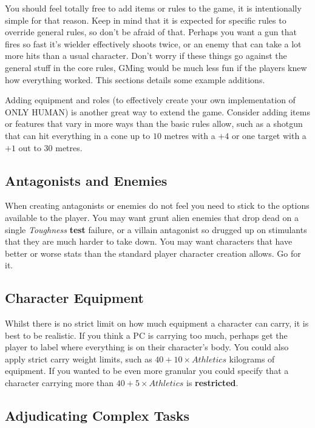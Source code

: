 \documentclass[11pt]{article}
\begin{document}
\begin{multicols}{3}
  You should feel totally free to add items or rules to the game, it is intentionally simple for that reason. Keep in mind that it is expected for specific rules to override general rules, so don't be afraid of that. Perhaps you want a gun that fires so fast it's wielder effectively shoots twice, or an enemy that can take a lot more hits than a usual character. Don't worry if these things go against the general stuff in the core rules, GMing would be much less fun if the players knew how everything worked. This sections details some example additions.

  Adding equipment and roles (to effectively create your own implementation of ONLY HUMAN) is another great way to extend the game. Consider adding items or features that vary in more ways than the basic rules allow, such as a shotgun that can hit everything in a cone up to $10$ metres with a $+4$ or one target with a $+1$ out to $30$ metres.

  \subsection*{Antagonists and Enemies}

  When creating antagonists or enemies do not feel you need to stick to the options available to the player. You may want grunt alien enemies that drop dead on a single \textit{Toughness} \textbf{test} failure, or a villain antagonist so drugged up on stimulants that they are much harder to take down. You may want characters that have better or worse stats than the standard player character creation allows. Go for it.

  \subsection*{Character Equipment}

  Whilst there is no strict limit on how much equipment a character can carry, it is best to be realistic. If you think a PC is carrying too much, perhaps get the player to label where everything is on their character's body. You could also apply strict carry weight limits, such as $40 + 10 \times Athletics$ kilograms of equipment. If you wanted to be even more granular you could specify that a character carrying more than $40 + 5 \times Athletics$ is \textbf{restricted}.

  \subsection*{Adjudicating Complex Tasks}


\end{multicols}
\end{document}

